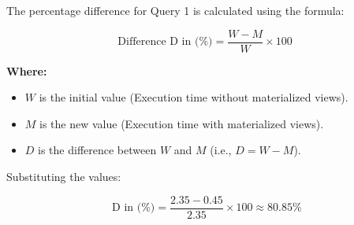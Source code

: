 The percentage difference for Query 1 is calculated using the formula:

\begin{equation}
\text{Difference D in  (\%)} = \frac{W - M}{W} \times 100
\end{equation}

\noindent \textbf{Where:}
\begin{itemize}
    \item \( W \) is the initial value (Execution time without materialized views).
    \item \( M \) is the new value (Execution time with materialized views).
    \item \( D \) is the difference between \( W \) and \( M \) (i.e., \( D = W - M \)).
\end{itemize}

Substituting the values:

\[
\text{ D in (\%)} = \frac{2.35 - 0.45}{2.35} \times 100 \approx 80.85\%
\]